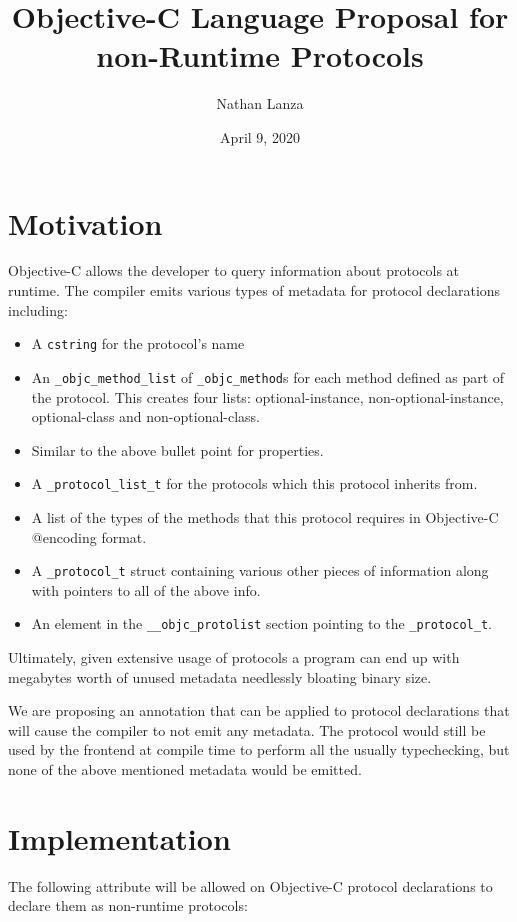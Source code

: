 \documentclass{article}
\title{Objective-C Language Proposal for non-Runtime Protocols}
\author{Nathan Lanza}
\date{April 9, 2020}
\begin{document}
\maketitle
\section{Motivation}

Objective-C allows the developer to query information about protocols at
runtime. The compiler emits various types of metadata for protocol declarations
including:

\begin{itemize}
  \item A \verb|cstring| for the protocol's name
  \item An \verb|_objc_method_list| of \verb|_objc_method|s for each method
    defined as part of the protocol. This creates four lists: optional-instance,
    non-optional-instance, optional-class and non-optional-class.
  \item Similar to the above bullet point for properties.
  \item A \verb|_protocol_list_t| for the protocols which this protocol inherits
    from.
  \item A list of the types of the methods that this protocol requires in
    Objective-C @encoding format.
  \item A \verb|_protocol_t| struct containing various other pieces of
    information along with pointers to all of the above info.
  \item An element in the \verb|__objc_protolist| section pointing to the
    \verb|_protocol_t|.
\end{itemize}

Ultimately, given extensive usage of protocols a program can end up with
megabytes worth of unused metadata needlessly bloating binary size.

We are proposing an annotation that can be applied to protocol declarations that
will cause the compiler to not emit any metadata. The protocol would still be
used by the frontend at compile time to perform all the usually typechecking,
but none of the above mentioned metadata would be emitted.

\section{Implementation}

The following attribute will be allowed on Objective-C protocol declarations to
declare them as non-runtime protocols:
\end{document}
